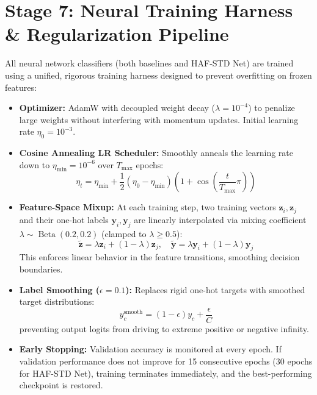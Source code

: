 \documentclass[a4paper, 11pt]{article}
\begin{document}
\section{Stage 7: Neural Training Harness \& Regularization Pipeline}

All neural network classifiers (both baselines and HAF-STD Net) are trained using a unified, rigorous training harness designed to prevent overfitting on frozen features:

\begin{itemize}
    \item \textbf{Optimizer:} AdamW with decoupled weight decay ($\lambda = 10^{-4}$) to penalize large weights without interfering with momentum updates. Initial learning rate $\eta_0 = 10^{-3}$.
    \item \textbf{Cosine Annealing LR Scheduler:} Smoothly anneals the learning rate down to $\eta_{\min} = 10^{-6}$ over $T_{\max}$ epochs:
    \begin{equation}
        \eta_t = \eta_{\min} + \frac{1}{2}(\eta_0 - \eta_{\min})\left(1 + \cos\left(\frac{t}{T_{\max}}\pi\right)\right)
    \end{equation}
    \item \textbf{Feature-Space Mixup:} At each training step, two training vectors $\mathbf{z}_i, \mathbf{z}_j$ and their one-hot labels $\mathbf{y}_i, \mathbf{y}_j$ are linearly interpolated via mixing coefficient $\lambda \sim \operatorname{Beta}(0.2, 0.2)$ (clamped to $\lambda \ge 0.5$):
    \begin{equation}
        \tilde{\mathbf{z}} = \lambda \mathbf{z}_i + (1 - \lambda)\mathbf{z}_j, \quad \tilde{\mathbf{y}} = \lambda \mathbf{y}_i + (1 - \lambda)\mathbf{y}_j
    \end{equation}
    This enforces linear behavior in the feature transitions, smoothing decision boundaries.
    \item \textbf{Label Smoothing ($\epsilon = 0.1$):} Replaces rigid one-hot targets with smoothed target distributions:
    \begin{equation}
        y_c^{\text{smooth}} = (1 - \epsilon) y_c + \frac{\epsilon}{C}
    \end{equation}
    preventing output logits from driving to extreme positive or negative infinity.
    \item \textbf{Early Stopping:} Validation accuracy is monitored at every epoch. If validation performance does not improve for 15 consecutive epochs (30 epochs for HAF-STD Net), training terminates immediately, and the best-performing checkpoint is restored.
\end{itemize}
\end{document}
